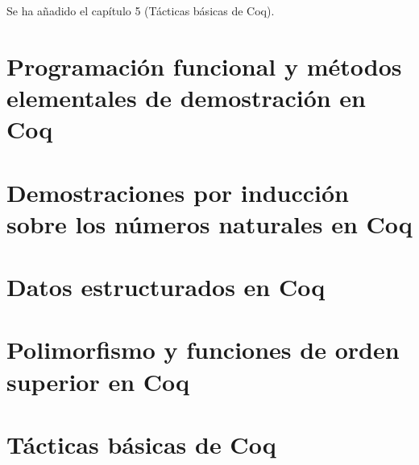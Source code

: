 \documentclass[a4paper,12pt,twoside]{book}
\begin{document}
Se ha añadido el capítulo 5 (Tácticas básicas de Coq).

\chapter{Programación funcional y métodos elementales de demostración en Coq}

\chapter{Demostraciones por inducción sobre los números naturales en Coq}

\chapter{Datos estructurados en Coq}

\chapter{Polimorfismo y funciones de orden superior en Coq}

\chapter{Tácticas básicas de Coq}

% 
\end{document}
